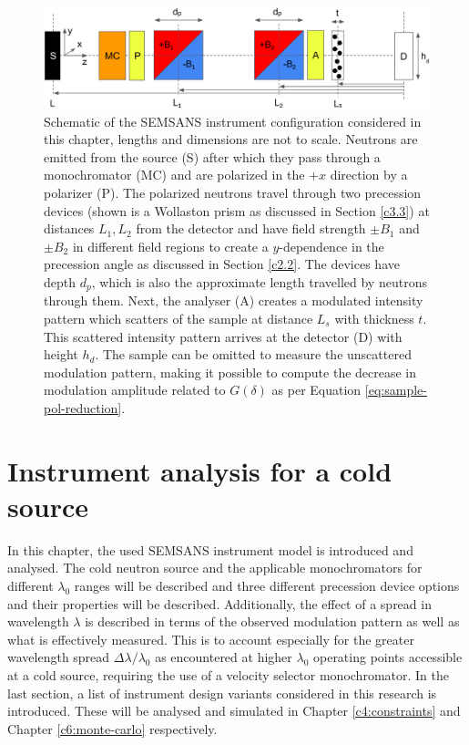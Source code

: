 \documentclass{article}
\begin{document}
\newpage
\begin{figure}[hbtp]
	\centering
	\includegraphics[width=\linewidth]{instrument-configuration}
	\caption{Schematic of the SEMSANS instrument configuration considered in this chapter, lengths and dimensions are not to scale. Neutrons are emitted from the source (S) after which they pass through a monochromator (MC) and are polarized in the $+x$ direction by a polarizer (P). The polarized neutrons travel through two precession devices (shown is a Wollaston prism as discussed in Section \ref{c3.3}) at distances $L_1, L_2$ from the detector and have field strength $\pm B_1$ and $\pm B_2$ in different field regions to create a $y$-dependence in the precession angle as discussed in Section \ref{c2.2}. The devices have depth $d_p$, which is also the approximate length travelled by neutrons through them. Next, the analyser (A) creates a modulated intensity pattern which scatters of the sample at distance $L_s$ with thickness $t$. This scattered intensity pattern arrives at the detector (D) with height $h_d$. The sample can be omitted to measure the unscattered modulation pattern, making it possible to compute the decrease in modulation amplitude related to $G(\delta)$ as per Equation \eqref{eq:sample-pol-reduction}.}
	\label{fig:instrument-config}
\end{figure}

\section{Instrument analysis for a cold source}
\label{c3}
In this chapter, the used SEMSANS instrument model is introduced and analysed. The cold neutron source and the applicable monochromators for different $\lambda_0$ ranges will be described and three different precession device options and their properties will be described. Additionally, the effect of a spread in wavelength $\lambda$ is described in terms of the observed modulation pattern as well as what is effectively measured. This is to account especially for the greater wavelength spread $\Delta\lambda/\lambda_0$ as encountered at higher $\lambda_0$ operating points accessible at a cold source, requiring the use of a velocity selector monochromator. In the last section, a list of instrument design variants considered in this research is introduced. These will be analysed and simulated in Chapter \ref{c4:constraints} and Chapter \ref{c6:monte-carlo} respectively. 
\end{document}
